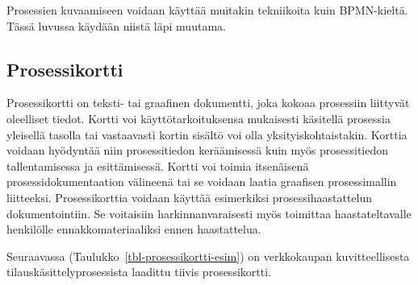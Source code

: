 \documentclass[
  finnish,
  letterpaper,
  DIV=11,
  numbers=noendperiod,
  oneside]{scrreprt}
\begin{document}
Prosessien kuvaamiseen voidaan käyttää muitakin tekniikoita kuin
BPMN-kieltä. Tässä luvussa käydään niistä läpi muutama.

\subsection{Prosessikortti}\label{prosessikortti}

Prosessikortti on teksti- tai graafinen dokumentti, joka kokoaa
prosessiin liittyvät oleelliset tiedot. Kortti voi käyttötarkoituksensa
mukaisesti käsitellä prosessia yleisellä tasolla tai vastaavasti kortin
sisältö voi olla yksityiskohtaistakin. Korttia voidaan hyödyntää niin
prosessitiedon keräämisessä kuin myös prosessitiedon tallentamisessa ja
esittämisessä. Kortti voi toimia itsenäisenä prosessidokumentaation
välineenä tai se voidaan laatia graafisen prosessimallin liitteeksi.
Prosessikorttia voidaan käyttää esimerkiksi prosessihaastattelun
dokumentointiin. Se voitaisiin harkinnanvaraisesti myös toimittaa
haastateltavalle henkilölle ennakkomateriaaliksi ennen haastattelua.

Seuraavassa (Taulukko~\ref{tbl-prosessikortti-esim}) on verkkokaupan
kuvitteellisesta tilauskäsittelyprosessista laadittu tiivis
prosessikortti.
\end{document}
